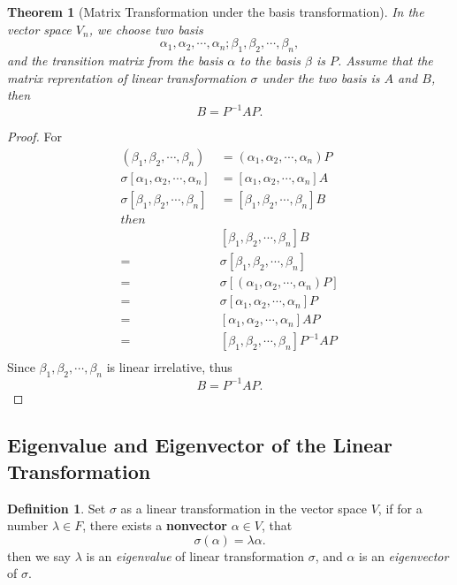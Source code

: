 \documentclass{article}
\newtheorem{theorem}{Theorem}[section]
\theoremstyle{definition}
\newtheorem{defi}{Definition}[section]
\begin{document}
\begin{theorem}[Matrix Transformation under the basis transformation]
    In the vector space $V_{n}$, we choose two basis
    $$\alpha_{1},\alpha_{2},\cdots,\alpha_{n};\beta_{1},\beta_{2},\cdots,\beta_{n},$$
    and the transition matrix from the basis $\alpha$ to the basis $\beta$ is $P$.
    Assume that the matrix reprentation of linear transformation $\sigma$ under the two basis 
    is $A$ and $B$, then 
    $$B=P^{-1}AP.$$
\label{MatrixTransUnderBasisTrans}
\end{theorem}

\begin{proof}
    For 
    \begin{align*}
        (\beta_{1},\beta_{2},\cdots,\beta_{n}) & = (\alpha_{1},\alpha_{2},\cdots,\alpha_{n})P\\
        \sigma[\alpha_{1},\alpha_{2},\cdots,\alpha_{n}] & = [\alpha_{1},\alpha_{2},\cdots,\alpha_{n}]A\\
        \sigma[\beta_{1},\beta_{2},\cdots,\beta_{n}] & = [\beta_{1},\beta_{2},\cdots,\beta_{n}]B\\
        then \\
        & [\beta_{1},\beta_{2},\cdots,\beta_{n}]B\\
         =&\sigma[\beta_{1},\beta_{2},\cdots,\beta_{n}]\\
         =&\sigma[(\alpha_{1},\alpha_{2},\cdots,\alpha_{n})P]\\
         =&\sigma[\alpha_{1},\alpha_{2},\cdots,\alpha_{n}]P\\
         =&[\alpha_{1},\alpha_{2},\cdots,\alpha_{n}]AP\\
         =&[\beta_{1},\beta_{2},\cdots,\beta_{n}]P^{-1}AP\\
    \end{align*}
    Since $\beta_{1},\beta_{2},\cdots,\beta_{n}$ is linear irrelative, 
    thus $$B=P^{-1}AP.$$
\end{proof}

\subsection{Eigenvalue and Eigenvector of the Linear Transformation}

\begin{defi}
    Set $\sigma$ as a linear transformation in the vector space $V$,
    if for a number $\lambda\in F$, there exists a \textbf{nonvector} $\alpha\in V$,
    that 
    $$\sigma(\alpha)=\lambda\alpha.$$
    then we say $\lambda$ is an \textit{eigenvalue} of linear transformation $\sigma$, and
    $\alpha$ is an \textit{eigenvector} of $\sigma$.
\end{defi}
\end{document}
